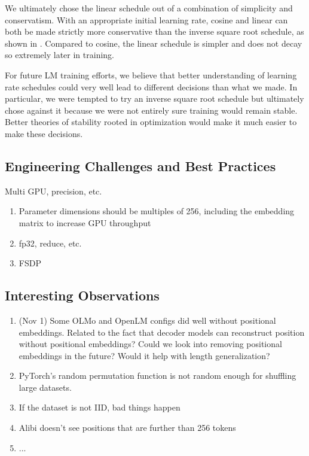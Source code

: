 We ultimately chose the linear schedule out of a combination of simplicity and conservatism. 
With an appropriate initial learning rate,
cosine and linear can both be made strictly more conservative than the inverse square root schedule, as shown in .
Compared to cosine, the linear schedule is simpler and does not decay so extremely later in training.

For future LM training efforts, we believe that better understanding of learning rate schedules could very well lead to different decisions than what we made.
In particular, we were tempted to try an inverse square root schedule but ultimately chose against it because we were not entirely sure training would remain stable.
Better theories of stability rooted in optimization would make it much easier to make these decisions.

\subsection{Engineering Challenges and Best Practices}

Multi GPU, precision, etc.

\begin{enumerate}
    \item Parameter dimensions should be multiples of 256, including the embedding matrix to increase GPU throughput
    \item fp32, reduce, etc.
    \item FSDP
\end{enumerate}


\subsection{Interesting Observations}


\begin{enumerate}
    \item (Nov 1) Some OLMo and OpenLM configs did well without positional embeddings. Related to the fact that decoder models can reconstruct position without positional embeddings? Could we look into removing positional embeddings in the future? Would it help with length generalization?

    \item PyTorch's random permutation function is not random enough for shuffling large datasets. 

    \item If the dataset is not IID, bad things happen    

    \item Alibi doesn't see positions that are further than 256 tokens

    \item ...
\end{enumerate}